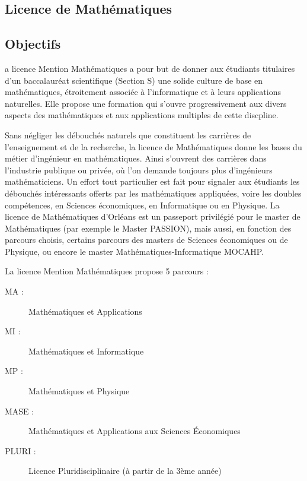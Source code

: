 \documentclass[10pt, a5paper]{report}
\begin{document}
\begin{spacing}{1.5}

\chapter*{Licence de Mathématiques}

\footnotesize
\section*{Objectifs}



a licence Mention Mathématiques a pour but de donner aux étudiants titulaires d'un baccalauréat scientifique (Section S) une solide culture de base en mathématiques, étroitement associée à l'informatique et à leurs applications naturelles. Elle propose une formation qui s'ouvre progressivement aux divers aspects des mathématiques et aux applications multiples de cette discpline.

Sans négliger les débouchés naturels que constituent les carrières de l'enseignement et de la recherche, la licence de Mathématiques donne les bases du métier d'ingénieur en mathématiques. Ainsi s'ouvrent des carrières dans l'industrie publique ou privée, où l'on demande toujours plus d'ingénieurs mathématiciens. Un effort tout particulier est fait pour signaler aux étudiants les débouchés intéressants offerts par les mathématiques appliquées, voire les doubles compétences, en Sciences économiques, en Informatique ou en Physique. La licence de Mathématiques d'Orléans est un passeport privilégié pour le master de Mathématiques (par exemple le Master PASSION), mais aussi, en fonction des parcours choisis, certains parcours des masters de Sciences économiques ou de Physique, ou encore le master Mathématiques-Informatique MOCAHP.

La licence Mention Mathématiques propose 5 parcours :
\begin{description}
\item[MA :] Mathématiques et Applications
\item[MI :] Mathématiques et Informatique
\item[MP :] Mathématiques et Physique
\item[MASE :] Mathématiques et Applications aux Sciences \'Economiques
\item[PLURI :] Licence Pluridisciplinaire (à partir de la 3ème année)
\end{description}


\end{spacing}
\end{document}

